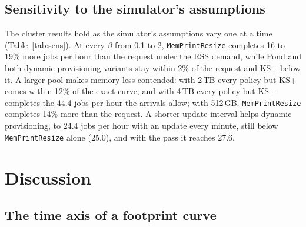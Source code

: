 \documentclass[11pt]{article}
\newcommand{\pass}{\texttt{MemPrintResize}}
\newcommand{\tabref}[1]{Table~\ref{#1}}
\begin{document}
\subsection{Sensitivity to the simulator's assumptions}
\label{sec:sensitivity}

\begin{table}[t]
\centering\small
\resizebox{\textwidth}{!}{}
\resizebox{\textwidth}{!}{}

\caption{Throughput (jobs per hour) at offered load 0.8 as the remote-memory slowdown $\beta$ (default 0.5), the pool
(default 1\,TB) and the update interval of dynamic provisioning (default 5 minutes) vary, one at a time, mean of three
seeds. Without a pool, 1{,}112 jobs per stream larger than a node are rejected, so that case is left out.}
\label{tab:sens}
\end{table}

The cluster results hold as the simulator's assumptions vary one at a time (\tabref{tab:sens}). At every $\beta$ from
0.1 to 2, \pass{} completes 16 to 19\% more jobs per hour than the request under the RSS demand, while Pond and both
dynamic-provisioning variants stay within 2\% of the request and KS+ below it. A larger pool makes memory less
contended: with 2\,TB every policy but KS+ comes within 12\% of the exact curve, and with 4\,TB every policy but KS+ completes the 44.4 jobs per hour the arrivals
allow; with 512\,GB, \pass{} completes 14\% more than the request. A shorter update interval helps dynamic
provisioning, to 24.4 jobs per hour with an update every minute, still below \pass{} alone (25.0), and with the pass
it reaches 27.6.

\section{Discussion}
\label{sec:discussion}

\subsection{The time axis of a footprint curve}
\label{sec:clock}

\begin{table}[t]
\centering\small

\caption{MemPrint's footprint curves under the RSS truth, with the Pin tool's clock and unit options: the margin
(headroom as a share of the curve's peak) each program needs for the curve never to fall below its RSS, over 23
programs, and the mean response time at 80\% load with calibrated margins.}
\label{tab:clock}
\end{table}
\end{document}
